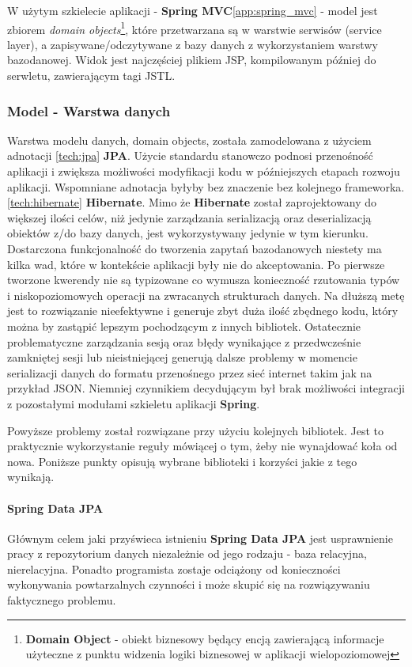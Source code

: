 		W użytym szkielecie aplikacji - \textbf{Spring MVC}\ref{app:spring_mvc} - model jest zbiorem \textit{domain objects}\footnote{
		\textbf{Domain Object} - obiekt biznesowy będący encją zawierającą informacje użyteczne z punktu widzenia logiki biznesowej w 
		aplikacji wielopoziomowej}, które przetwarzana są w warstwie serwisów (service layer), a zapisywane/odczytywane z bazy danych
		z wykorzystaniem warstwy bazodanowej. Widok jest najczęściej plikiem JSP, kompilowanym później do serwletu, zawierającym
		tagi JSTL.
		
		\subsubsection{Model - Warstwa danych}
			Warstwa modelu danych, domain objects, została zamodelowana z użyciem adnotacji \ref{tech:jpa} \textbf{JPA}. Użycie 
			standardu stanowczo podnosi przenośność aplikacji i zwiększa możliwości modyfikacji kodu w późniejszych
			etapach rozwoju aplikacji. Wspomniane adnotacja byłyby bez znaczenie bez kolejnego frameworka. \ref{tech:hibernate} \textbf{Hibernate}.
			Mimo że \textbf{Hibernate} został zaprojektowany do większej ilości celów, niż jedynie zarządzania serializacją oraz
			deserializacją obiektów z/do bazy danych, jest wykorzystywany jedynie w tym kierunku. Dostarczona funkcjonalność do tworzenia
			zapytań bazodanowych niestety ma kilka wad, które w kontekście aplikacji były nie do akceptowania. Po pierwsze tworzone
			kwerendy nie są typizowane co wymusza konieczność rzutowania typów i niskopoziomowych operacji na zwracanych strukturach
			danych. Na dłuższą metę jest to rozwiązanie nieefektywne i generuje zbyt duża ilość zbędnego kodu, który można by zastąpić
			lepszym pochodzącym z innych bibliotek. Ostatecznie problematyczne zarządzania sesją oraz błędy wynikające z przedwcześnie
			zamkniętej sesji lub nieistniejącej generują dalsze problemy w momencie serializacji danych do formatu przenośnego przez sieć
			internet takim jak na przykład JSON. Niemniej czynnikiem decydującym był brak możliwości integracji z pozostałymi modułami 
			szkieletu aplikacji \textbf{Spring}.
		
			Powyższe problemy został rozwiązane przy użyciu kolejnych bibliotek. Jest to praktycznie wykorzystanie reguły mówiącej o
			tym, żeby nie wynajdować koła od nowa. Poniższe punkty opisują wybrane biblioteki i korzyści jakie z tego wynikają.
			\paragraph{Spring Data JPA}
				Głównym celem jaki przyświeca istnieniu \textbf{Spring Data JPA} jest usprawnienie pracy z repozytorium danych niezależnie
				od jego rodzaju - baza relacyjna, nierelacyjna. Ponadto programista zostaje odciążony od konieczności wykonywania powtarzalnych
				czynności i może skupić się na rozwiązywaniu faktycznego problemu.
